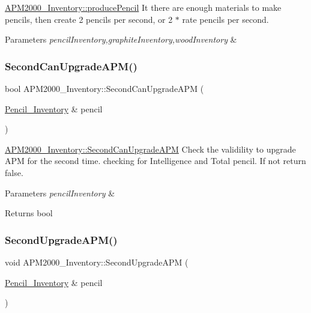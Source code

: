\mbox{\hyperlink{classAPM2000__Inventory_ad7ffc7e7536509d26d76800b2398bfc0}{A\+P\+M2000\+\_\+\+Inventory\+::produce\+Pencil}} It there are enough materials to make pencils, then create 2 pencils per second, or 2 $\ast$ rate pencils per second. 


\begin{DoxyParams}{Parameters}
{\em pencil\+Inventory,graphite\+Inventory,wood\+Inventory} & \\
\hline
\end{DoxyParams}
\mbox{\label{classAPM2000__Inventory_a752f84068143b5f79f4e25b846b25a6c}} 
\subsubsection{\texorpdfstring{SecondCanUpgradeAPM()}{SecondCanUpgradeAPM()}}
{\footnotesize\ttfamily bool A\+P\+M2000\+\_\+\+Inventory\+::\+Second\+Can\+Upgrade\+A\+PM (\begin{DoxyParamCaption}\item[{\mbox{\hyperlink{classPencil__Inventory}{Pencil\+\_\+\+Inventory}} \&}]{pencil }\end{DoxyParamCaption})}



\mbox{\hyperlink{classAPM2000__Inventory_a752f84068143b5f79f4e25b846b25a6c}{A\+P\+M2000\+\_\+\+Inventory\+::\+Second\+Can\+Upgrade\+A\+PM}} Check the validility to upgrade A\+PM for the second time. checking for Intelligence and Total pencil. If not return false. 


\begin{DoxyParams}{Parameters}
{\em pencil\+Inventory} & \\
\hline
\end{DoxyParams}
\begin{DoxyReturn}{Returns}
bool 
\end{DoxyReturn}
\mbox{\label{classAPM2000__Inventory_af6637ca987470d8603bba595b31d7cc0}} 
\subsubsection{\texorpdfstring{SecondUpgradeAPM()}{SecondUpgradeAPM()}}
{\footnotesize\ttfamily void A\+P\+M2000\+\_\+\+Inventory\+::\+Second\+Upgrade\+A\+PM (\begin{DoxyParamCaption}\item[{\mbox{\hyperlink{classPencil__Inventory}{Pencil\+\_\+\+Inventory}} \&}]{pencil }\end{DoxyParamCaption})}



